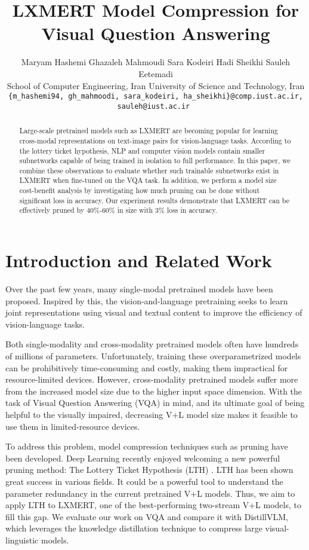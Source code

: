 \documentclass[11pt,a4paper]{article}
\title{LXMERT Model Compression for Visual Question Answering}
\author{
Maryam Hashemi \hspace{0.2cm} Ghazaleh Mahmoudi  \Thanks{ These authors contributed equally.} \hspace{0.2cm} Sara Kodeiri \hspace{0.2cm} Hadi Sheikhi\hspace{0.2cm} Sauleh Eetemadi  \\
School of Computer Engineering,
Iran University of Science and Technology, Iran \\
\small{\texttt{\{m\_hashemi94, gh\_mahmoodi, sara\_kodeiri, ha\_sheikhi\}@comp.iust.ac.ir, sauleh@iust.ac.ir }}}
\begin{document}
\maketitle
\begin{abstract}
Large-scale pretrained models such as LXMERT are becoming popular for learning cross-modal representations on text-image pairs for vision-language tasks. According to the lottery ticket hypothesis, NLP and computer vision models contain smaller subnetworks capable of being trained in isolation to full performance. In this paper, we combine these observations to evaluate whether such trainable subnetworks exist in LXMERT when fine-tuned on the VQA task. In addition, we perform a model size cost-benefit analysis by investigating how much pruning can be done without significant loss in accuracy. Our experiment results demonstrate that LXMERT can be effectively pruned by 40\%-60\% in size with 3\% loss in accuracy. 
\end{abstract}

\section{Introduction and Related Work}
Over the past few years, many single-modal pretrained models have been proposed. Inspired by this, the vision-and-language pretraining seeks to learn joint representations using visual and textual content to improve the efficiency of vision-language tasks.

Both single-modality and cross-modality pretrained models often have hundreds of millions of parameters. Unfortunately, training these overparametrized models can be prohibitively time-consuming and costly, making them impractical for resource-limited devices. However, cross-modality pretrained models suffer more from the increased model size due to the higher input space dimension. With the task of Visual Question Answering (VQA) \cite{Antol2015} in mind, and its ultimate goal of being helpful to the visually impaired, decreasing V+L model size makes it feasible to use them in limited-resource devices.

To address this problem, model compression techniques such as pruning have been developed. Deep Learning recently enjoyed welcoming a new powerful pruning method: The Lottery Ticket Hypothesis (LTH) \cite{frankle2018the}. LTH has been shown great success in various fields. It could be a powerful tool to understand the parameter redundancy in the current pretrained V+L models. Thus, we aim to apply LTH to LXMERT\cite{Tan2020}, one of the best-performing two-stream V+L models, to fill this gap. We evaluate our work on VQA \cite{Antol2015} and compare it with DistillVLM\cite{Fang_2021_ICCV}, which leverages the knowledge distillation technique to compress large visual-linguistic models.
\end{document}
